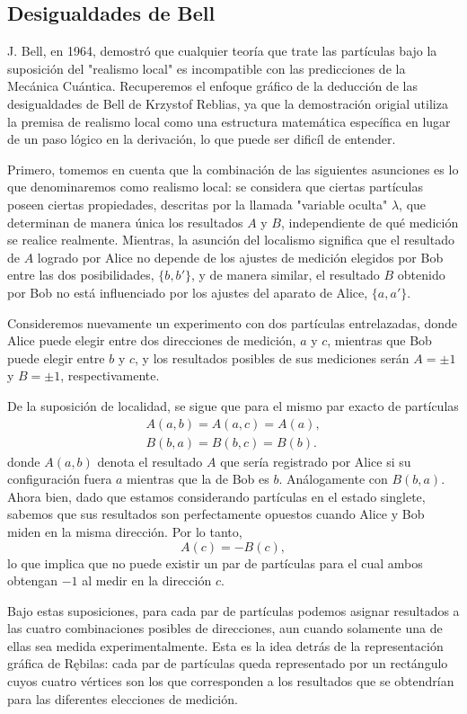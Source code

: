 \subsection{Desigualdades de Bell}%
J. Bell, en 1964, demostró que cualquier teoría que trate las partículas bajo la suposición del "realismo local" es incompatible con las predicciones de la Mecánica Cuántica. Recuperemos el enfoque gráfico de la deducción de las desigualdades de Bell de Krzystof Reblias, ya que la demostración origial utiliza la premisa de realismo local como una estructura matemática específica en lugar de un paso lógico en la derivación, lo que puede ser dificíl de entender. \cite{Rebilas}

Primero, tomemos en cuenta que la combinación de las siguientes asunciones es lo que denominaremos como realismo local: se considera que ciertas partículas poseen ciertas propiedades, descritas por la llamada "variable oculta" $\lambda$, que determinan de manera única los resultados $A$ y $B$, independiente de qué medición se realice realmente. Mientras, la asunción del localismo significa que el resultado de $A$ logrado por Alice no depende de los ajustes de medición elegidos por Bob entre las dos posibilidades, $\{b, b'\}$, y de manera similar, el resultado $B$ obtenido por Bob no está influenciado por los ajustes del aparato de Alice, $\{a, a'\}$. \cite{Rebilas}

Consideremos nuevamente un experimento con dos partículas entrelazadas, donde Alice puede elegir entre dos direcciones de medición, $a$ y $c$, mientras que Bob puede elegir entre $b$ y $c$, y los resultados posibles de sus mediciones serán $A=\pm1$ y $B=\pm1$, respectivamente.

De la suposición de localidad, se sigue que para el mismo par exacto de partículas
\begin{gather*}
	A(a,b)=A(a,c)=A(a),
	\\
	B(b,a)=B(b,c)=B(b).
\end{gather*}
donde $A(a,b)$ denota el resultado $A$ que sería registrado por Alice si su configuración fuera $a$ mientras que la de Bob es $b$. Análogamente con $B(b,a)$. Ahora bien, dado que estamos considerando partículas en el estado singlete, sabemos que sus resultados son perfectamente opuestos cuando Alice y Bob miden en la misma dirección. Por lo tanto,
$$ A(c)=-B(c), $$
lo que implica que no puede existir un par de partículas para el cual ambos obtengan $-1$ al medir en la dirección $c$.

Bajo estas suposiciones, para cada par de partículas podemos asignar resultados a las cuatro combinaciones posibles de direcciones, aun cuando solamente una de ellas sea medida experimentalmente. Esta es la idea detrás de la representación gráfica de Rębilas: cada par de partículas queda representado por un rectángulo cuyos cuatro vértices son los que corresponden a los resultados que se obtendrían para las diferentes elecciones de medición.

